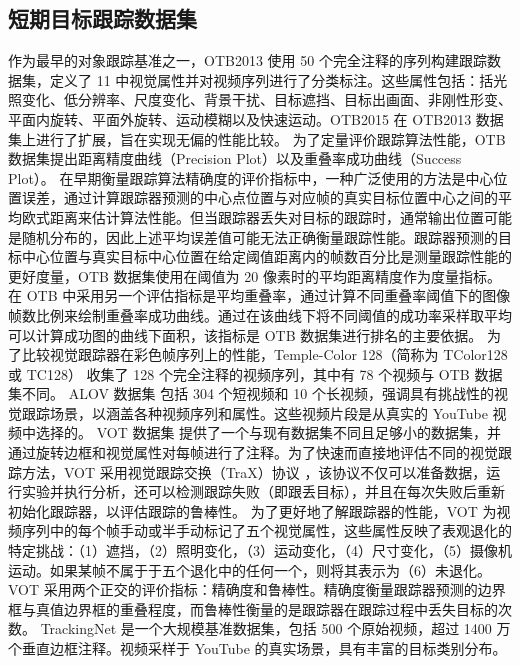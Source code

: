 \subsection{短期目标跟踪数据集}
作为最早的对象跟踪基准之一，OTB2013 \cite{OTB} 使用 50 个完全注释的序列构建跟踪数据集，定义了 11 中视觉属性并对视频序列进行了分类标注。这些属性包括：括光照变化、低分辨率、尺度变化、背景干扰、目标遮挡、目标出画面、非刚性形变、平面内旋转、平面外旋转、运动模糊以及快速运动。OTB2015 \cite{OTB2015} 在 OTB2013 数据集上进行了扩展，旨在实现无偏的性能比较。
为了定量评价跟踪算法性能，OTB 数据集提出距离精度曲线（Precision Plot）以及重叠率成功曲线（Success Plot）。
在早期衡量跟踪算法精确度的评价指标中，一种广泛使用的方法是中心位置误差，通过计算跟踪器预测的中心点位置与对应帧的真实目标位置中心之间的平均欧式距离来估计算法性能。但当跟踪器丢失对目标的跟踪时，通常输出位置可能是随机分布的，因此上述平均误差值可能无法正确衡量跟踪性能。跟踪器预测的目标中心位置与真实目标中心位置在给定阈值距离内的帧数百分比是测量跟踪性能的更好度量，OTB 数据集使用在阈值为 20 像素时的平均距离精度作为度量指标。在 OTB 中采用另一个评估指标是平均重叠率，通过计算不同重叠率阈值下的图像帧数比例来绘制重叠率成功曲线。通过在该曲线下将不同阈值的成功率采样取平均可以计算成功图的曲线下面积，该指标是 OTB 数据集进行排名的主要依据。
为了比较视觉跟踪器在彩色帧序列上的性能，Temple-Color 128（简称为 TColor128 或 TC128）\cite{TC128} 收集了 128 个完全注释的视频序列，其中有 78 个视频与 OTB 数据集不同。
ALOV 数据集 \cite{ALOV} 包括 304 个短视频和 10 个长视频，强调具有挑战性的视觉跟踪场景，以涵盖各种视频序列和属性。这些视频片段是从真实的 YouTube 视频中选择的。
VOT 数据集 \cite{VOT2015} 提供了一个与现有数据集不同且足够小的数据集，并通过旋转边框和视觉属性对每帧进行了注释。为了快速而直接地评估不同的视觉跟踪方法，VOT 采用视觉跟踪交换（TraX）协议 \cite{TraX}，该协议不仅可以准备数据，运行实验并执行分析，还可以检测跟踪失败（即跟丢目标），并且在每次失败后重新初始化跟踪器，以评估跟踪的鲁棒性。
为了更好地了解跟踪器的性能，VOT 为视频序列中的每个帧手动或半手动标记了五个视觉属性，这些属性反映了表观退化的特定挑战：（1）遮挡，（2）照明变化，（3）运动变化，（4）尺寸变化，（5）摄像机运动。如果某帧不属于于五个退化中的任何一个，则将其表示为（6）未退化。
VOT 采用两个正交的评价指标：精确度和鲁棒性。精确度衡量跟踪器预测的边界框与真值边界框的重叠程度，而鲁棒性衡量的是跟踪器在跟踪过程中丢失目标的次数。
TrackingNet \cite{muller2018trackingnet} 是一个大规模基准数据集，包括 500 个原始视频，超过 1400 万个垂直边框注释。视频采样于 YouTube 的真实场景，具有丰富的目标类别分布。
